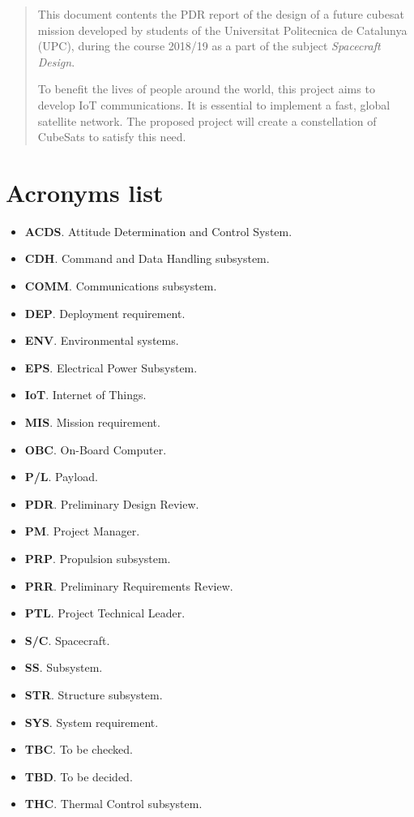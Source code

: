 \begin{abstract}
This document contents the PDR report of the design of a future cubesat mission
developed by students of the Universitat Politecnica de Catalunya (UPC), during
the course 2018/19 as a part of the subject \textit{Spacecraft Design}.

To benefit the lives of people around the world, this project aims to develop
IoT communications. It is essential to implement a fast, global satellite network.
The proposed project will create a constellation of CubeSats to satisfy this need.

\end{abstract}

\section*{Acronyms list}

\begin{itemize}
	\small
	\setlength\itemsep{0cm}
	\item \textbf{ACDS}. Attitude Determination and Control System.
	\item \textbf{CDH}. Command and Data Handling subsystem.
	\item \textbf{COMM}. Communications subsystem.
	\item \textbf{DEP}. Deployment requirement.
	\item \textbf{ENV}. Environmental systems.
	\item \textbf{EPS}. Electrical Power Subsystem.
	\item \textbf{IoT}. Internet of Things.
	\item \textbf{MIS}. Mission requirement.
	\item \textbf{OBC}. On-Board Computer.
	\item \textbf{P/L}. Payload.
	\item \textbf{PDR}. Preliminary Design Review.
	\item \textbf{PM}. Project Manager.
	\item \textbf{PRP}. Propulsion subsystem.
	\item \textbf{PRR}. Preliminary Requirements Review.
	\item \textbf{PTL}. Project Technical Leader.
	\item \textbf{S/C}. Spacecraft.
	\item \textbf{SS}. Subsystem.
	\item \textbf{STR}. Structure subsystem.
	\item \textbf{SYS}. System requirement.
	\item \textbf{TBC}. To be checked.
	\item \textbf{TBD}. To be decided.
	\item \textbf{THC}. Thermal Control subsystem.
\end{itemize}


